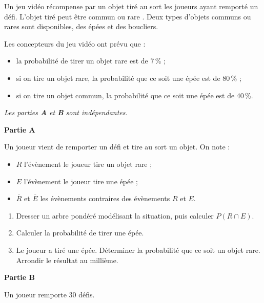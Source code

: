 
\medskip

Un jeu vidéo récompense par un objet tiré au sort les joueurs ayant remporté un défi. L'objet tiré peut être \og commun \fg{} ou \og rare \fg. Deux types d'objets communs ou rares sont disponibles, des épées et des boucliers.

Les concepteurs du jeu vidéo ont prévu que :

\begin{itemize}
\item la probabilité de tirer un objet rare est de 7\,\% ;
\item si on tire un objet rare, la probabilité que ce soit une épée est de 80\,\% ;
\item si on tire un objet commun, la probabilité que ce soit une épée est de 40\,\%.
\end{itemize}

\emph{Les parties \textbf{\rm A} et \textbf{\rm B} sont indépendantes.}

\bigskip

\textbf{Partie A}

\medskip

Un joueur vient de remporter un défi et tire au sort un objet. On note :

\begin{itemize}[label=$\bullet~$]
\item $R$ l'évènement \og le joueur tire un objet rare\fg{} ;
\item $E$ l'évènement \og le joueur tire une épée \fg{} ;
\item $\overline{R}$ et $\overline{E}$ les évènements contraires des évènements $R$ et $E$.
\end{itemize}

\medskip

\begin{enumerate}
\item Dresser un arbre pondéré modélisant la situation, puis calculer $P(R \cap E)$.
\item Calculer la probabilité de tirer une épée.
\item Le joueur a tiré une épée. Déterminer la probabilité que ce soit un objet rare. Arrondir
le résultat au millième.
\end{enumerate}

\bigskip

\textbf{Partie B}

\medskip

Un joueur remporte $30$ défis.

